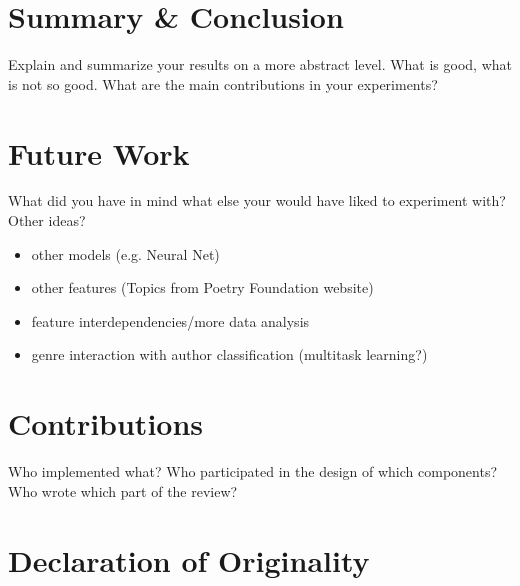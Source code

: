 \documentclass[11pt]{article}
\begin{document}
\section{Summary \& Conclusion}

Explain and summarize your results on a more abstract level. What is good, what is not so
good. What are the main contributions in your experiments?


\section{Future Work}

What did you have in mind what else your
would have liked to experiment with? Other ideas?
\begin{itemize}
\item other models (e.g. Neural Net)
\item other features (Topics from Poetry Foundation website)
\item feature interdependencies/more data analysis
\item genre interaction with author classification (multitask learning?)
\end{itemize}





\appendix

\section{Contributions}
Who implemented what?
Who participated in the design of which components?
Who wrote which part of the review?
\section{Declaration of Originality}
\label{sec:appendix}
\end{document}
